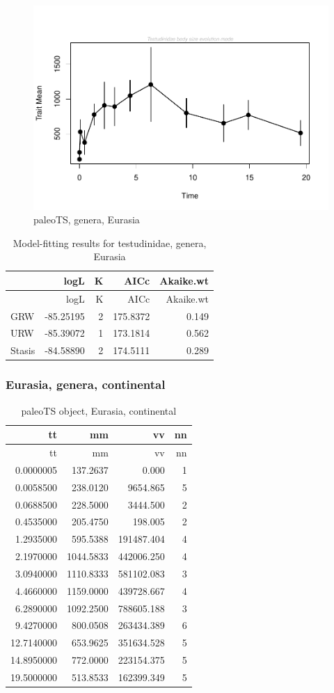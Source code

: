 \begin{figure}[H]
	\centering
	\includegraphics{MA_JJ_files/figure-latex/paleoTSEurasia-1.pdf}
	\caption{paleoTS, genera, Eurasia}
	\label{fig:pTSEs}
\end{figure}

\begin{longtable}[]{@{}lrrrr@{}}
	\caption{Model-fitting results for testudinidae, genera,
		Eurasia}
	\label{tab:pTSEsEM}\tabularnewline
	\toprule
	& logL & K & AICc & Akaike.wt\tabularnewline
	\midrule
	\endfirsthead
	\toprule
	& logL & K & AICc & Akaike.wt\tabularnewline
	\midrule
	\endhead
	GRW & -85.25195 & 2 & 175.8372 & 0.149\tabularnewline
	URW & -85.39072 & 1 & 173.1814 & 0.562\tabularnewline
	Stasis & -84.58890 & 2 & 174.5111 & 0.289\tabularnewline
	\bottomrule
\end{longtable}



\FloatBarrier

\subsubsection{Eurasia, genera,
	continental}\label{eurasiagenera-continental}

\begin{longtable}[]{@{}rrrr@{}}
	\caption{paleoTS object, Eurasia, continental}
	\label{tab:pTSEsC}\tabularnewline
	\toprule
	tt & mm & vv & nn\tabularnewline
	\midrule
	\endfirsthead
	\toprule
	tt & mm & vv & nn\tabularnewline
	\midrule
	\endhead
	0.0000005 & 137.2637 & 0.000 & 1\tabularnewline
	0.0058500 & 238.0120 & 9654.865 & 5\tabularnewline
	0.0688500 & 228.5000 & 3444.500 & 2\tabularnewline
	0.4535000 & 205.4750 & 198.005 & 2\tabularnewline
	1.2935000 & 595.5388 & 191487.404 & 4\tabularnewline
	2.1970000 & 1044.5833 & 442006.250 & 4\tabularnewline
	3.0940000 & 1110.8333 & 581102.083 & 3\tabularnewline
	4.4660000 & 1159.0000 & 439728.667 & 4\tabularnewline
	6.2890000 & 1092.2500 & 788605.188 & 3\tabularnewline
	9.4270000 & 800.0508 & 263434.389 & 6\tabularnewline
	12.7140000 & 653.9625 & 351634.528 & 5\tabularnewline
	14.8950000 & 772.0000 & 223154.375 & 5\tabularnewline
	19.5000000 & 513.8533 & 162399.349 & 5\tabularnewline
	\bottomrule
\end{longtable}

